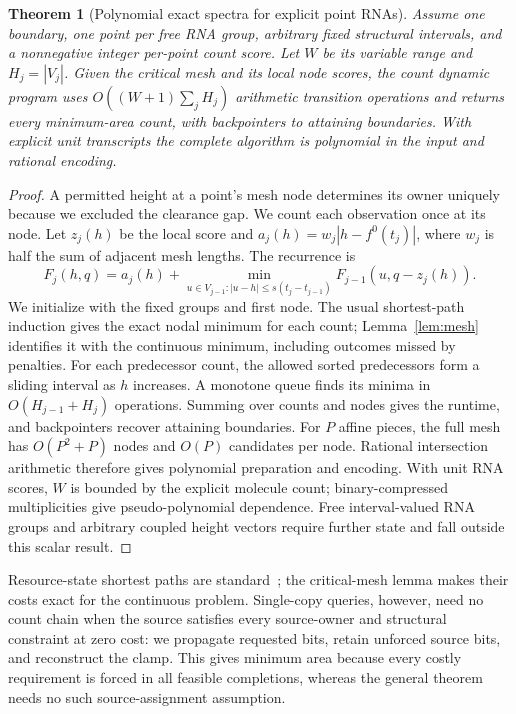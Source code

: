 \documentclass[10pt,letterpaper]{article}
\newtheorem{theorem}{Theorem}
\begin{document}
\begin{samepage}
\begin{theorem}[Polynomial exact spectra for explicit point RNAs]\label{thm:chain}
Assume one boundary, one point per free RNA group, arbitrary fixed structural intervals, and a nonnegative integer per-point count score. Let $W$ be its variable range and $H_j=|V_j|$. Given the critical mesh and its local node scores, the count dynamic program uses $O((W+1)\sum_jH_j)$ arithmetic transition operations and returns every minimum-area count, with backpointers to attaining boundaries. With explicit unit transcripts the complete algorithm is polynomial in the input and rational encoding.
\end{theorem}
\end{samepage}
\begin{proof}
A permitted height at a point's mesh node determines its owner uniquely because we excluded the clearance gap. We count each observation once at its node. Let $z_j(h)$ be the local score and $a_j(h)=w_j|h-f^0(t_j)|$, where $w_j$ is half the sum of adjacent mesh lengths. The recurrence is
\begin{equation}
F_j(h,q)=a_j(h)+\min_{u\in V_{j-1}:|u-h|\le s(t_j-t_{j-1})}
F_{j-1}(u,q-z_j(h)).\label{eq:dp}
\end{equation}
We initialize with the fixed groups and first node. The usual shortest-path induction gives the exact nodal minimum for each count; Lemma~\ref{lem:mesh} identifies it with the continuous minimum, including outcomes missed by penalties. For each predecessor count, the allowed sorted predecessors form a sliding interval as $h$ increases. A monotone queue finds its minima in $O(H_{j-1}+H_j)$ operations. Summing over counts and nodes gives the runtime, and backpointers recover attaining boundaries.
For $P$ affine pieces, the full mesh has $O(P^2+P)$ nodes and $O(P)$ candidates per node. Rational intersection arithmetic therefore gives polynomial preparation and encoding. With unit RNA scores, $W$ is bounded by the explicit molecule count; binary-compressed multiplicities give pseudo-polynomial dependence. Free interval-valued RNA groups and arbitrary coupled height vectors require further state and fall outside this scalar result.
\end{proof}

Resource-state shortest paths are standard~\cite{joksch}; the critical-mesh lemma makes their costs exact for the continuous problem. Single-copy queries, however, need no count chain when the source satisfies every source-owner and structural constraint at zero cost: we propagate requested bits, retain unforced source bits, and reconstruct the clamp. This gives minimum area because every costly requirement is forced in all feasible completions, whereas the general theorem needs no such source-assignment assumption.
\end{document}
